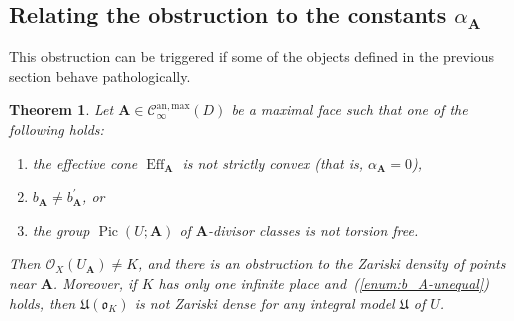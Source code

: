 \documentclass[a4paper, twoside, 10pt]{amsart}
\newcommand{\uA}{{\boldsymbol{A}}}
\newcommand{\cC}{\mathcal{C}}
\newcommand{\cO}{\mathcal{O}}
\newcommand{\mU}{\mathfrak{U}}
\newcommand{\fo}{\mathfrak{o}}
\newcommand{\Canmax}{\cC^{\mathrm{an,max}}}
\DeclareMathOperator{\Eff}{Eff}
\DeclareMathOperator{\Pic}{Pic}
\newtheorem{theorem}{Theorem}[subsection]
\theoremstyle{definition}
\begin{document}
\subsection{Relating the obstruction to the constants \texorpdfstring{$\alpha_\uA$}{alpha A}}\label{ssec:relation-obstruction-constant}

This obstruction can be triggered if some of the objects defined in the previous section behave pathologically.

\begin{theorem}\label{thm:obstruction-construction}
  Let $\uA\in\Canmax_\infty(D)$ be a maximal face such that one of the following holds:
  \begin{enumerate}
    \item\label{enum:nonconvex} the effective cone $\Eff_\uA$ is not strictly convex (that is, $\alpha_\uA = 0$),
    \item\label{enum:b_A-unequal} $b_\uA \neq b^\prime_\uA$, or
    \item\label{enum:torsion} the group $\Pic(U;\uA)$ of $\uA$-divisor classes is not torsion free.
  \end{enumerate}
  Then $\cO_X(U_\uA)\ne K$, and there is an obstruction to the Zariski density of points near $\uA$.
  Moreover, if $K$ has only one infinite place and~(\ref{enum:b_A-unequal}) holds, then $\mU(\fo_K)$ is not Zariski dense for any integral model $\mU$ of $U$.
\end{theorem}
\end{document}
